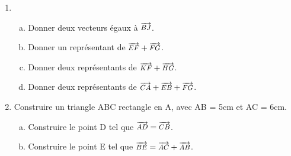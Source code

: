 \documentclass{beamer}
\newcommand\scalemath[2]{\scalebox{#1}{\mbox{\ensuremath{\displaystyle #2}}}}
\renewcommand{\vec}[1]{\scalemath{0.85}{\overrightarrow{#1}}}
\begin{document}
\begin{frame}
\begin{multicols}{2}
\begin{center}
		\end{center}
		\begin{enumerate}
			\item \begin{enumerate}[a.]
				      \item Donner deux vecteurs égaux à $\vec{BJ}$.
				      \item Donner un représentant de $\vec{EF} + \vec{FG}$.
				      \item Donner deux représentants de $\vec{KF} + \vec{HG}$.
				      \item Donner deux représentants de $\vec{CA} + \vec{EB} + \vec{FG}$.
			      \end{enumerate}
			\item Construire un triangle ABC rectangle en A, avec AB = 5cm et AC = 6cm.
			      \begin{enumerate}[a.]
				      \item Construire le point D tel que $\vec{AD} = \vec{CB}$.
				      \item Construire le point E tel que $\vec{BE} = \vec{AC} + \vec{AB}$.
			      \end{enumerate}
		\end{enumerate}
	\end{multicols}
\end{frame}
\end{document}

